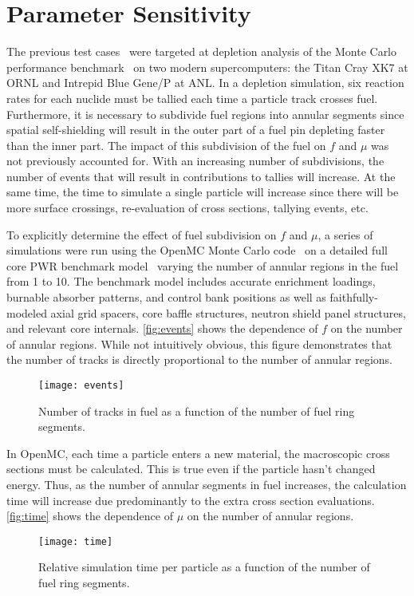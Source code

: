 \documentclass{snamc2013}
\begin{document}
\section{Parameter Sensitivity}

The previous test cases~\cite{jcp-romano-2013} were targeted at depletion
analysis of the Monte Carlo performance benchmark~\cite{mc2011-hoogenboom} on
two modern supercomputers: the Titan Cray XK7 at ORNL and Intrepid Blue Gene/P
at ANL. In a depletion simulation, six reaction rates for each nuclide must be
tallied each time a particle track crosses fuel. Furthermore, it is necessary to
subdivide fuel regions into annular segments since spatial self-shielding will
result in the outer part of a fuel pin depleting faster than the inner part. The
impact of this subdivision of the fuel on $f$ and $\mu$ was not previously
accounted for. With an increasing number of subdivisions, the number of events
that will result in contributions to tallies will increase. At the same time,
the time to simulate a single particle will increase since there will be more
surface crossings, re-evaluation of cross sections, tallying events, etc.

To explicitly determine the effect of fuel subdivision on $f$ and $\mu$, a
series of simulations were run using the OpenMC Monte Carlo
code~\cite{ane-romano-2013} on a detailed full core PWR benchmark
model~\cite{mc2013-horelik} varying the number of annular regions in the fuel
from 1 to 10. The benchmark model includes accurate enrichment loadings,
burnable absorber patterns, and control bank positions as well as
faithfully-modeled axial grid spacers, core baffle structures, neutron shield
panel structures, and relevant core internals. \autoref{fig:events} shows the
dependence of $f$ on the number of annular regions. While not intuitively
obvious, this figure demonstrates that the number of tracks is directly
proportional to the number of annular regions.
\begin{figure}[htb]
  \centering
  \texttt{[image: events]}
  \caption{Number of tracks in fuel as a function of the number of fuel ring
    segments.}
  \label{fig:events}
\end{figure}

In OpenMC, each time a particle enters a new material, the macroscopic cross
sections must be calculated. This is true even if the particle hasn't changed
energy. Thus, as the number of annular segments in fuel increases, the
calculation time will increase due predominantly to the extra cross section
evaluations. \autoref{fig:time} shows the dependence of $\mu$ on the number of
annular regions.
\begin{figure}[b]
  \centering
  \texttt{[image: time]}
  \caption{Relative simulation time per particle as a function of the number of
    fuel ring segments.}
  \label{fig:time}
\end{figure}
\end{document}
